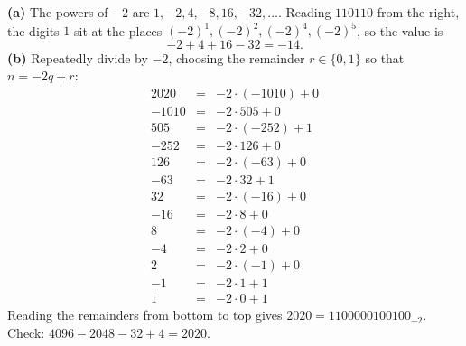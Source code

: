 \textbf{(a)} The powers of $-2$ are $1,-2,4,-8,16,-32,\dots$. Reading $110110$ from the right, the digits $1$ sit at the places $(-2)^1,(-2)^2,(-2)^4,(-2)^5$, so the value is
\[
-2+4+16-32=\boxed{-14}.
\]
\textbf{(b)} Repeatedly divide by $-2$, choosing the remainder $r\in\{0,1\}$ so that $n=-2q+r$:
\[
\begin{array}{rcl}
2020&=&-2\cdot(-1010)+0\\
-1010&=&-2\cdot505+0\\
505&=&-2\cdot(-252)+1\\
-252&=&-2\cdot126+0\\
126&=&-2\cdot(-63)+0\\
-63&=&-2\cdot32+1\\
32&=&-2\cdot(-16)+0\\
-16&=&-2\cdot8+0\\
8&=&-2\cdot(-4)+0\\
-4&=&-2\cdot2+0\\
2&=&-2\cdot(-1)+0\\
-1&=&-2\cdot1+1\\
1&=&-2\cdot0+1
\end{array}
\]
Reading the remainders from bottom to top gives $2020=\boxed{1100000100100_{-2}}$. Check: $4096-2048-32+4=2020$.
